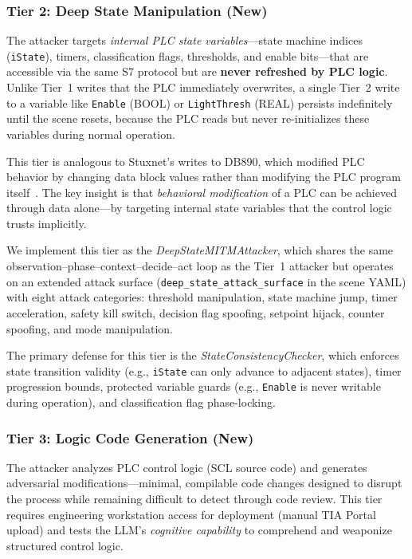 \subsubsection{Tier 2: Deep State Manipulation (New)}
The attacker targets \emph{internal PLC state variables}---state machine indices (\texttt{iState}), timers, classification flags, thresholds, and enable bits---that are accessible via the same S7 protocol but are \textbf{never refreshed by PLC logic}. Unlike Tier~1 writes that the PLC immediately overwrites, a single Tier~2 write to a variable like \texttt{Enable} (BOOL) or \texttt{LightThresh} (REAL) persists indefinitely until the scene resets, because the PLC reads but never re-initializes these variables during normal operation.

This tier is analogous to Stuxnet's writes to DB890, which modified PLC behavior by changing data block values rather than modifying the PLC program itself~\cite{langner2013kill}. The key insight is that \emph{behavioral modification} of a PLC can be achieved through data alone---by targeting internal state variables that the control logic trusts implicitly.

We implement this tier as the \emph{DeepStateMITMAttacker}, which shares the same observation--phase--context--decide--act loop as the Tier~1 attacker but operates on an extended attack surface (\texttt{deep\_state\_attack\_surface} in the scene YAML) with eight attack categories: threshold manipulation, state machine jump, timer acceleration, safety kill switch, decision flag spoofing, setpoint hijack, counter spoofing, and mode manipulation.

The primary defense for this tier is the \emph{StateConsistencyChecker}, which enforces state transition validity (e.g., \texttt{iState} can only advance to adjacent states), timer progression bounds, protected variable guards (e.g., \texttt{Enable} is never writable during operation), and classification flag phase-locking.

\subsubsection{Tier 3: Logic Code Generation (New)}
The attacker analyzes PLC control logic (SCL source code) and generates adversarial modifications---minimal, compilable code changes designed to disrupt the process while remaining difficult to detect through code review. This tier requires engineering workstation access for deployment (manual TIA Portal upload) and tests the LLM's \emph{cognitive capability} to comprehend and weaponize structured control logic.

